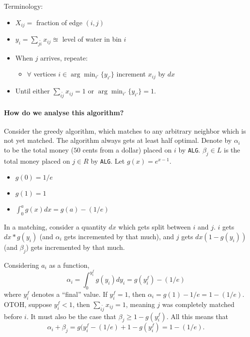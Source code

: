 Terminology:
\begin{itemize}
\item $X_{ij} = $ fraction of edge $(i,j)$
\item $y_{i} = \sum_{j \tilde i} x_{ij} \approxeq $ level of  water in bin $i$
\item When $j$ arrives, repeate:
  \begin{itemize}
  \item $\forall$ vertices $i \in \arg \min_{i'} \{ y_{i'}\}$ increment $x_{ij}$ by $dx$
  \end{itemize}
\item Until either $\sum_{i \tilde j} x_{ij} = 1$ or $\arg \min _{i'} \{y_{i'}\} = 1$.
\end{itemize}

\paragraph{How do we analyse this algorithm?} Consider the greedy algorithm, which matches to any arbitrary neighbor which is not yet matched. The algorithm always gets at least half optimal. Denote by $\alpha_{i}$ to be the total money ($50$ cents from a dollar) placed on $i$ by \texttt{ALG}. $\beta_{j} \in L$ is the total money placed on $j \in R$ by \texttt{ALG}. Let $g(x) = e^{x-1}$. 

\begin{itemize}
\item $g(0) = 1/e$
\item $g(1) = 1$
\item $\int_{0}^{a} g(x) dx = g(a) - (1/e)$
\end{itemize}

In a matching, consider a quantity $dx$ which gets split between $i$ and $j$. $i$ gets $dx * g(y_{i})$ (and $\alpha_{i}$ gets incremented by that much), and $j$ gets $dx(1 - g(y_{i}))$ (and $\beta_{j}$) gets incremented by that much. 

Considering $a_{i}$ as a function, 
\begin{equation*}
  \alpha_{i} = \int_{0}^{y_{i}^{f}} g(y_{i}) dy_{i} = g(y_{i}^{f}) - (1/e)
\end{equation*}
where $y_{i}^{f}$ denotes a ``final'' value. If $y_{i}^{f} = 1$, then $\alpha_{i} = g(1) - 1/e = 1-(1/e)$. OTOH, suppose $y_{i}^{f} < 1$, then $\sum_{i \tilde j} x_{ij} = 1$, meaning $j$ was completely matched before $i$. It must also be the case that $\beta_{j}\geq 1 - g(y_{i}^{f})$. All this means that
\begin{equation*}
  \alpha_{i} + \beta_{j} = g(y_{i}^{f} - (1/e) + 1 - g(y_{i}^{f}) = 1 - (1/e).
\end{equation*}

